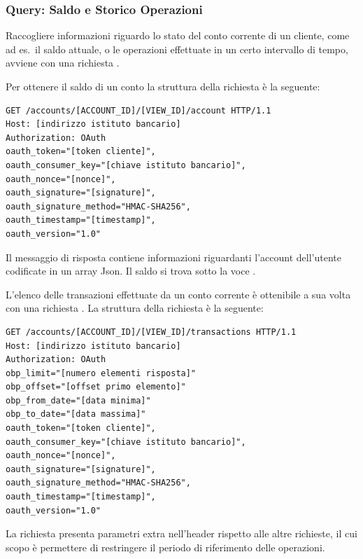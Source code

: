 \subsubsection{Query: Saldo e Storico Operazioni}

Raccogliere informazioni riguardo lo stato del conto corrente di un cliente, come ad es.\ il saldo attuale, o le operazioni effettuate in un certo intervallo di tempo, avviene con una richiesta .

Per ottenere il saldo di un conto la struttura della richiesta \`e la seguente:
\begin{lstlisting}[basicstyle=\ttfamily]
GET /accounts/[ACCOUNT_ID]/[VIEW_ID]/account HTTP/1.1
Host: [indirizzo istituto bancario]
Authorization: OAuth
oauth_token="[token cliente]",
oauth_consumer_key="[chiave istituto bancario]",
oauth_nonce="[nonce]",
oauth_signature="[signature]",
oauth_signature_method="HMAC-SHA256",
oauth_timestamp="[timestamp]",
oauth_version="1.0"
\end{lstlisting}
Il messaggio di risposta contiene informazioni riguardanti l'account dell'utente codificate in un array Json.
Il saldo si trova sotto la voce .

L'elenco delle transazioni effettuate da un conto corrente \`e ottenibile a sua volta con una richiesta .
La struttura della richiesta \`e la seguente:
\begin{lstlisting}[basicstyle=\ttfamily]
GET /accounts/[ACCOUNT_ID]/[VIEW_ID]/transactions HTTP/1.1
Host: [indirizzo istituto bancario]
Authorization: OAuth
obp_limit="[numero elementi risposta]"
obp_offset="[offset primo elemento]"
obp_from_date="[data minima]"
obp_to_date="[data massima]"
oauth_token="[token cliente]",
oauth_consumer_key="[chiave istituto bancario]",
oauth_nonce="[nonce]",
oauth_signature="[signature]",
oauth_signature_method="HMAC-SHA256",
oauth_timestamp="[timestamp]",
oauth_version="1.0"
\end{lstlisting}
La richiesta presenta parametri extra nell'header rispetto alle altre richieste, il cui scopo \`e permettere di restringere il periodo di riferimento delle operazioni.



